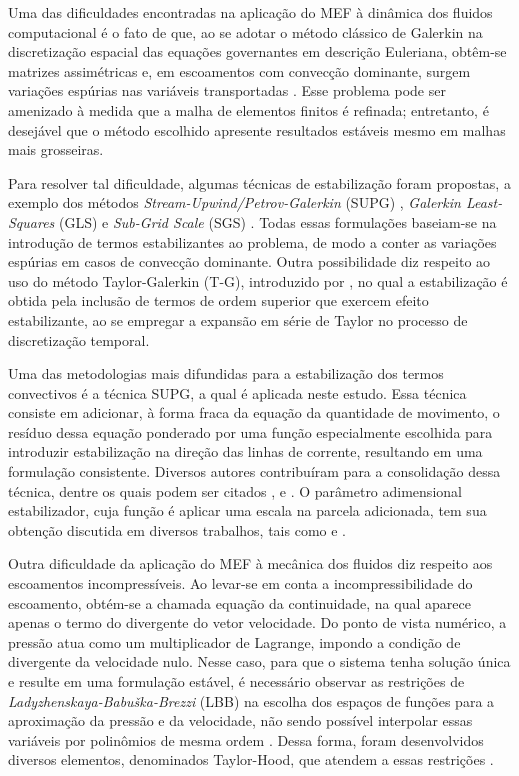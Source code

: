 Uma das dificuldades encontradas na aplicação do MEF à dinâmica dos fluidos computacional é o fato de que, ao se adotar o método clássico de Galerkin na discretização espacial das equações governantes em descrição Euleriana, obtêm-se matrizes assimétricas e, em escoamentos com convecção dominante, surgem variações espúrias nas variáveis transportadas \cite{BrooksH:1982,ZienkiewiczTN:2005a}. Esse problema pode ser amenizado à medida que a malha de elementos finitos é refinada; entretanto, é desejável que o método escolhido apresente resultados estáveis mesmo em malhas mais grosseiras.

Para resolver tal dificuldade, algumas técnicas de estabilização foram propostas, a exemplo dos métodos \textit{Stream-Upwind/Petrov-Galerkin} (SUPG) \cite{BrooksH:1982}, \textit{Galerkin Least-Squares} (GLS) \cite{HughesFH:1989} e \textit{Sub-Grid Scale} (SGS) \cite{Hughes:1995}. Todas essas formulações baseiam-se na introdução de termos estabilizantes ao problema, de modo a conter as variações espúrias em casos de convecção dominante. Outra possibilidade diz respeito ao uso do método Taylor-Galerkin (T-G), introduzido por , no qual a estabilização é obtida pela inclusão de termos de ordem superior que exercem efeito estabilizante, ao se empregar a expansão em série de Taylor no processo de discretização temporal.

Uma das metodologias mais difundidas para a estabilização dos termos convectivos é a técnica SUPG, a qual é aplicada neste estudo. Essa técnica consiste em adicionar, à forma fraca da equação da quantidade de movimento, o resíduo dessa equação ponderado por uma função especialmente escolhida para introduzir estabilização na direção das linhas de corrente, resultando em uma formulação consistente. Diversos autores contribuíram para a consolidação dessa técnica, dentre os quais podem ser citados ,  e . O parâmetro adimensional estabilizador, cuja função é aplicar uma escala na parcela adicionada, tem sua obtenção discutida em diversos trabalhos, tais como  e .

Outra dificuldade da aplicação do MEF à mecânica dos fluidos diz respeito aos escoamentos incompressíveis. Ao levar-se em conta a incompressibilidade do escoamento, obtém-se a chamada equação da continuidade, na qual aparece apenas o termo do divergente do vetor velocidade. Do ponto de vista numérico, a pressão atua como um multiplicador de Lagrange, impondo a condição de divergente da velocidade nulo. Nesse caso, para que o sistema tenha solução única e resulte em uma formulação estável, é necessário observar as restrições de \textit{Ladyzhenskaya-Babuška-Brezzi} (LBB) na escolha dos espaços de funções para a aproximação da pressão e da velocidade, não sendo possível interpolar essas variáveis por polinômios de mesma ordem \cite{BrezziF:1991,StrangF:2008,ZienkiewiczTN:2005b}. Dessa forma, foram desenvolvidos diversos elementos, denominados Taylor-Hood, que atendem a essas restrições \cite{DoneaH:2003}.


